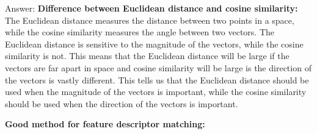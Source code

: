 \documentclass{article}
\begin{document}
Answer:
\textbf{Difference between Euclidean distance and cosine similarity: } The Euclidean distance measures the distance between two points in a space, while the cosine similarity measures the angle between two vectors. The Euclidean distance is sensitive to the magnitude of the vectors, while the cosine similarity is not. This means that the Euclidean distance will be large if the vectors are far apart in space and cosine similarity will be large is the direction of the vectors is vastly different. This tells us that the Euclidean distance should be used when the magnitude of the vectors is important, while the cosine similarity should be used when the direction of the vectors is important. 

\textbf{Good method for feature descriptor matching: } 
\end{document}
